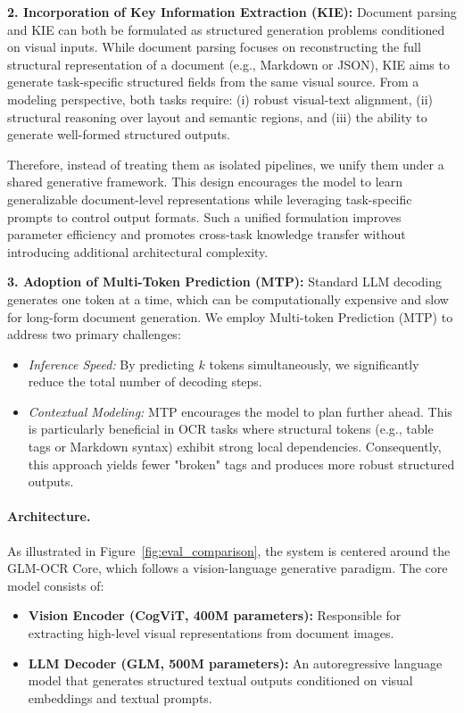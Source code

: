 \textbf{2. Incorporation of Key Information Extraction (KIE):} 
Document parsing and KIE can both be formulated as structured generation problems conditioned on visual inputs. While document parsing focuses on reconstructing the full structural representation of a document (e.g., Markdown or JSON), KIE aims to generate task-specific structured fields from the same visual source. From a modeling perspective, both tasks require:
(i) robust visual-text alignment,
(ii) structural reasoning over layout and semantic regions, and
(iii) the ability to generate well-formed structured outputs.

Therefore, instead of treating them as isolated pipelines, we unify them under a shared generative framework. This design encourages the model to learn generalizable document-level representations while leveraging task-specific prompts to control output formats. Such a unified formulation improves parameter efficiency and promotes cross-task knowledge transfer without introducing additional architectural complexity.

\textbf{3. Adoption of Multi-Token Prediction (MTP):} 
Standard LLM decoding generates one token at a time, which can be computationally expensive and slow for long-form document generation. We employ Multi-token Prediction (MTP) to address two primary challenges:
\begin{itemize}
    \item \textit{Inference Speed:} By predicting $k$ tokens simultaneously, we significantly reduce the total number of decoding steps.
    \item \textit{Contextual Modeling:} MTP encourages the model to plan further ahead. This is particularly beneficial in OCR tasks where structural tokens (e.g., table tags or Markdown syntax) exhibit strong local dependencies. Consequently, this approach yields fewer "broken" tags and produces more robust structured outputs.
\end{itemize}

\paragraph{Architecture.} 
As illustrated in Figure~\ref{fig:eval_comparison}, the system is centered around the GLM-OCR Core, which follows a vision-language generative paradigm. The core model consists of:

\begin{itemize}
    \item \textbf{Vision Encoder (CogViT, 400M parameters):} Responsible for extracting high-level visual representations from document images.
    \item \textbf{LLM Decoder (GLM, 500M parameters):} An autoregressive language model that generates structured textual outputs conditioned on visual embeddings and textual prompts.
\end{itemize}


